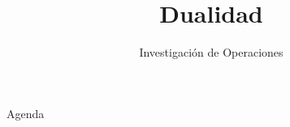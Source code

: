 \documentclass[../slides.tex]{subfiles}
\title{Dualidad}
\subtitle{Investigación de Operaciones} %
\begin{document}
\begin{frame}
  \maketitle
\end{frame}


\begin{frame}{Agenda}
  \tableofcontents
\end{frame}





\begin{frame}
  \maketitle
\end{frame}
\end{document}
